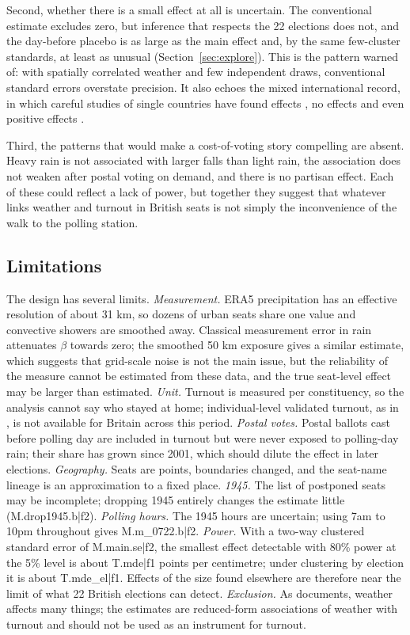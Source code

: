 \documentclass[11pt,a4paper]{article}
\begin{document}
Second, whether there is a small effect at all is uncertain. The conventional estimate excludes zero, but inference that respects the 22 elections does not, and the day-before placebo is as large as the main effect and, by the same few-cluster standards, at least as unusual (Section~\ref{sec:explore}). This is the pattern \citet{cooperman2017} warned of: with spatially correlated weather and few independent draws, conventional standard errors overstate precision. It also echoes the mixed international record, in which careful studies of single countries have found effects \citep{damsbo2023,eisinga2012turnout}, no effects \citep{persson2014} and even positive effects \citep{lind2020}.

Third, the patterns that would make a cost-of-voting story compelling are absent. Heavy rain is not associated with larger falls than light rain, the association does not weaken after postal voting on demand, and there is no partisan effect. Each of these could reflect a lack of power, but together they suggest that whatever links weather and turnout in British seats is not simply the inconvenience of the walk to the polling station.

\subsection{Limitations}
The design has several limits. \emph{Measurement.} ERA5 precipitation has an effective resolution of about 31 km, so dozens of urban seats share one value and convective showers are smoothed away. Classical measurement error in rain attenuates $\beta$ towards zero; the smoothed 50 km exposure gives a similar estimate, which suggests that grid-scale noise is not the main issue, but the reliability of the measure cannot be estimated from these data, and the true seat-level effect may be larger than estimated. \emph{Unit.} Turnout is measured per constituency, so the analysis cannot say who stayed at home; individual-level validated turnout, as in \citet{damsbo2023}, is not available for Britain across this period. \emph{Postal votes.} Postal ballots cast before polling day are included in turnout but were never exposed to polling-day rain; their share has grown since 2001, which should dilute the effect in later elections. \emph{Geography.} Seats are points, boundaries changed, and the seat-name lineage is an approximation to a fixed place. \emph{1945.} The list of postponed seats may be incomplete; dropping 1945 entirely changes the estimate little ({{M.drop1945.b|f2}}). \emph{Polling hours.} The 1945 hours are uncertain; using 7am to 10pm throughout gives {{M.m_0722.b|f2}}. \emph{Power.} With a two-way clustered standard error of {{M.main.se|f2}}, the smallest effect detectable with 80\% power at the 5\% level is about {{T.mde|f1}} points per centimetre; under clustering by election it is about {{T.mde_el|f1}}. Effects of the size found elsewhere are therefore near the limit of what 22 British elections can detect. \emph{Exclusion.} As \citet{mellon2025} documents, weather affects many things; the estimates are reduced-form associations of weather with turnout and should not be used as an instrument for turnout.
\end{document}

